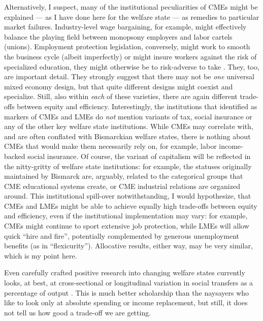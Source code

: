 \begin{enumerate}
{		Alternatively, I suspect, many of the institutional peculiarities of \glspl{CME} might be explained --- as I have done here for the welfare state --- as remedies to particular market failures.
		Industry-level wage bargaining, for example, might effectively balance the playing field between monopsony employers and labor cartels (unions).
		Employment protection legislation, conversely, might work to smooth the business cycle (albeit imperfectly) or might insure workers against the risk of specialized education, they might otherwise be to risk-adverse to take \citep[for example,][444]{Offe2003}.
	}
	They, too, are important detail.
	They strongly suggest that there may not be \emph{one} universal mixed economy design, but that quite different designs might coexist and specialize.
	Still, also within \emph{each} of these varieties, there are again different trade-offs between equity and efficiency.
	Interestingly, the institutions that \citeauthor{HallSoskice-2001-aa} identified as markers of \glspl{CME} and \glspl{LME} do \emph{not} mention variants of tax, social insurance or any of the other key welfare state institutions.
	While \glspl{CME} may correlate with, and are often conflated with Bismarckian welfare states, there is nothing about \glspl{CME} that would make them necessarily rely on, for example, labor income-backed social insurance.
	Of course, the variant of capitalism will be reflected in the nitty-gritty of welfare state institutions:
	for example, the statuses originally maintained by Bismarck are, arguably, related to the categorical groups that \gls{CME} educational systems create, or \gls{CME} industrial relations are organized around.
	This institutional spill-over notwithstanding, I would hypothesize, that \glspl{CME} and \glspl{LME} might be able to achieve equally high trade-offs between equity and efficiency, even if the institutional implementation may vary:
	for example, \glspl{CME} might continue to sport extensive job protection, while \glspl{LME} will allow quick ``hire and fire'', potentially complemented by generous unemployment benefits (as in ``flexicurity'').
	Allocative results, either way, may be very similar, which is my point here.

	Even carefully crafted positive research into changing welfare states currently looks, at best, at cross-sectional or longitudinal variation in social transfers as a percentage of output \citep[for example,][249]{Ravenhill2005}.
	This is much better scholarship than the naysayers who like to look only at absolute spending or income replacement, but still, it does not tell us how good a trade-off we are getting.


\end{enumerate}
